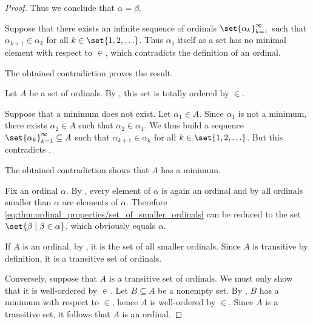 \begin{proof}
  Thus we conclude that \( \alpha = \beta \).

   Suppose that there exists an infinite sequence of ordinals \( \set{ \alpha_k }_{k=1}^\infty \) such that \( \alpha_{k+1} \in \alpha_k \) for all \( k \in \set{ 1, 2, \ldots } \). Thus \( \alpha_1 \) itself as a set has no minimal element with respect to \( \in \), which contradicts the definition of an ordinal.

  The obtained contradiction proves the result.

   Let \( A \) be a set of ordinals. By , this set is totally ordered by \( \in \).

  Suppose that a minimum does not exist. Let \( \alpha_1 \in A \). Since \( \alpha_1 \) is not a minimum, there exists \( \alpha_2 \in A \) such that \( \alpha_2 \in \alpha_1 \). We thus build a sequence \( \set{ \alpha_k }_{k=1}^\infty \subseteq A \) such that \( \alpha_{k+1} \in \alpha_k \) for all \( k \in \set{ 1, 2, \ldots } \). But this contradicts .

  The obtained contradiction shows that \( A \) has a minimum.

   Fix an ordinal \( \alpha \). By , every element of \( \alpha \) is again an ordinal and by  all ordinals smaller than \( \alpha \) are elements of \( \alpha \). Therefore \eqref{eq:thm:ordinal_properties/set_of_smaller_ordinals} can be reduced to the set \( \set{ \beta \given \beta \in \alpha } \), which obviously equals \( \alpha \).

   If \( A \) is an ordinal, by , it is the set of all smaller ordinals. Since \( A \) is transitive by definition, it is a transitive set of ordinals.

  Conversely, suppose that \( A \) is a transitive set of ordinals. We must only show that it is well-ordered by \( \in \). Let \( B \subseteq A \) be a nonempty set. By , \( B \) has a minimum with respect to \( \in \), hence \( A \) is well-ordered by \( \in \). Since \( A \) is a transitive set, it follows that \( A \) is an ordinal.
\end{proof}

